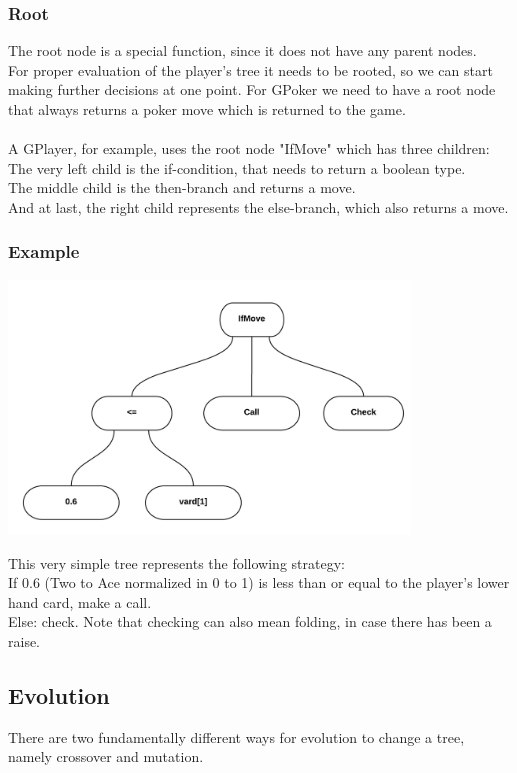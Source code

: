 \documentclass[12pt,fleqn,a4paper]{article}
\begin{document}
\subsubsection{Root}
The root node is a special function, since it does not have any parent nodes.\\
For proper evaluation of the player's tree it needs to be rooted, so we can start making further decisions at one point.
For GPoker we need to have a root node that always returns a poker move which is returned to the game.\\
~\\
A GPlayer, for example, uses the root node "IfMove" which has three children:\\
The very left child is the if-condition, that needs to return a boolean type.\\
The middle child is the then-branch and returns a move.\\
And at last, the right child represents the else-branch, which also returns a move.\\

\newpage

\subsubsection{Example}
\begin{center}
	\includegraphics[width=0.8\textwidth]{tree1.png}
\end{center}
This very simple tree represents the following strategy:
~\\
If 0.6 (Two to Ace normalized in 0 to 1) is less than or equal to the player's lower hand card, make a call.\\
Else: check. Note that checking can also mean folding, in case there has been a raise.

\subsection{Evolution}
There are two fundamentally different ways for evolution to change a tree, namely crossover and mutation.
\end{document}
